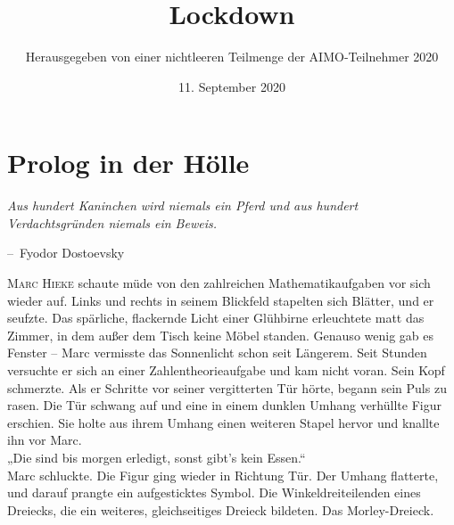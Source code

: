\documentclass[oneside]{memoir}
\title{Lockdown}
\author{Herausgegeben von einer nichtleeren Teilmenge der AIMO-Teilnehmer 2020}
\date{11. September 2020}
\makeatletter
\newenvironment{chapquote}[2][2em]
  {\setlength{\@tempdima}{#1}%
   \def\chapquote@author{#2}%
   \parshape 1 \@tempdima \dimexpr\textwidth-2\@tempdima\relax%
   \itshape}
  {\par\normalfont\hfill--\ \chapquote@author\hspace*{\@tempdima}\par\bigskip}
\makeatother
\begin{document}
\begin{titlingpage}
\maketitle
\end{titlingpage}
\newpage
\thispagestyle{empty}
\begin{center}
\end{center}
\setcounter{page}{2}
\chapter{Prolog in der Hölle}

\begin{chapquote}{Fyodor Dostoevsky}
\glqq Aus hundert Kaninchen wird niemals ein Pferd und aus hundert Verdachtsgründen niemals ein Beweis.\grqq
\end{chapquote}

\lettrine{M}{arc Hieke} schaute müde von den zahlreichen Mathematikaufgaben vor sich wieder auf. Links und rechts in seinem Blickfeld stapelten sich Blätter, und er seufzte. Das spärliche, flackernde Licht einer Glühbirne erleuchtete matt das Zimmer, in dem außer dem Tisch keine Möbel standen. Genauso wenig gab es Fenster -- Marc vermisste das Sonnenlicht schon seit Längerem. Seit Stunden versuchte er sich an einer Zahlentheorieaufgabe und kam nicht voran. Sein Kopf schmerzte. Als er Schritte vor seiner vergitterten Tür hörte, begann sein Puls zu rasen. Die Tür schwang auf und eine in einem dunklen Umhang verhüllte Figur erschien. Sie holte aus ihrem Umhang einen weiteren Stapel hervor und knallte ihn vor Marc. \\
„Die sind bis morgen erledigt, sonst gibt's kein Essen.“ \\
Marc schluckte. Die Figur ging wieder in Richtung Tür. Der Umhang flatterte, und darauf prangte ein aufgesticktes Symbol. Die Winkeldreiteilenden eines Dreiecks, die ein weiteres, gleichseitiges Dreieck bildeten. Das Morley-Dreieck.
\end{document}
